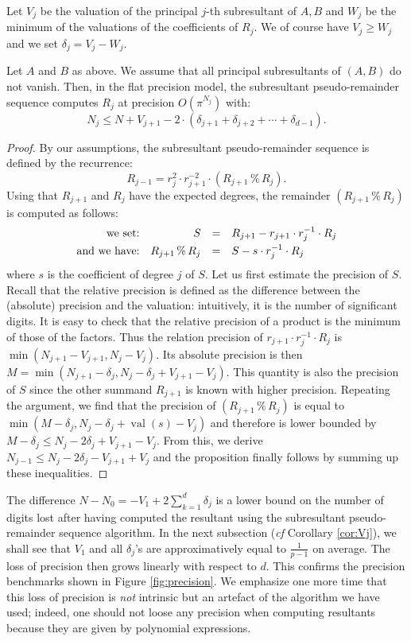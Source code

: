 \documentclass{article}
\DeclareMathOperator{\val}{val}
\begin{document}
Let $V_j$ be the valuation of the principal $j$-th subresultant of $A,B$ 
and $W_j$ be the minimum of the valuations of the coefficients of $R_j$. 
We of course have $V_j \geq W_j$ and we set $\delta_j = V_j - W_j$.

\begin{prop}
\label{prop:precEuclide}
Let $A$ and $B$ as above. We assume that all principal subresultants of 
$(A,B)$ do not vanish. Then, in the flat precision model, the 
subresultant pseudo-remainder sequence computes $R_j$ at precision 
$O(\pi^{N_j})$ with:
$$N_j \leq N + V_{j+1} - 2 \cdot (\delta_{j+1} + \delta_{j+2} + \cdots
+ \delta_{d-1}).$$
\end{prop}

\begin{proof}
By our assumptions, the subresultant pseudo-remainder sequence 
is defined by the recurrence:
$$R_{j-1} = r_j^2 \cdot r_{j+1}^{-2} \cdot 
(R_{j+1} \,\%\, R_j).$$
Using that $R_{j+1}$ and $R_j$ have the expected degrees, the
remainder $(R_{j+1} \,\%\, R_j)$ is computed as follows:
$$\begin{array}{rrcl}
\text{we set:} & S & = & R_{j+1} - r_{j+1} \cdot r_j^{-1} \cdot R_j \smallskip \\
\text{and we have:} & R_{j+1} \,\%\, R_j & = & S - s \cdot r_j^{-1} \cdot R_j
\end{array}$$
where $s$ is the coefficient of degree $j$ of $S$. Let us first estimate 
the precision of $S$. Recall that the relative precision is defined 
as the difference between the (absolute) precision and the valuation: 
intuitively, it is the number of significant digits. It is easy to check 
that the relative precision of a product is the minimum of those of the 
factors. 
Thus the relation precision of $r_{j+1} \cdot r_j^{-1} \cdot R_j$ is
$\min(N_{j+1} - V_{j+1}, N_j - V_j)$. Its absolute precision is then
$M = \min(N_{j+1} - \delta_j, N_j - \delta_j + V_{j+1} - V_j)$. This
quantity is also the precision of $S$ since the other summand
$R_{j+1}$ is known with higher precision. Repeating the argument, we
find that the precision of $(R_{j+1} \,\%\, R_j)$ is equal to 
$\min(M - \delta_j, N_j - \delta_j + \val(s) - V_j)$ and therefore is 
lower bounded by $M - \delta_j \leq N_j - 2 \delta_j + V_{j+1} - V_j$.
From this, we derive $N_{j-1} \leq N_j - 2 \delta_j - V_{j+1} + V_j$ and
the proposition finally follows by summing up these inequalities.
\end{proof}

The difference 
$N - N_0 = - V_1 + 2 \sum_{k=1}^d \delta_j$
is a lower bound on the number of digits lost after having computed the 
resultant using the subresultant pseudo-remainder sequence algorithm. In 
the next subsection (\emph{cf} Corollary \ref{cor:Vj}), we shall see that 
$V_1$ and all $\delta_j$'s are 
approximatively equal to $\frac 1 {p-1}$ on average. The loss of 
precision then grows linearly with respect to $d$. This confirms the 
precision benchmarks shown in Figure \ref{fig:precision}.
We emphasize one more time that this loss of precision is \emph{not}
intrinsic but an artefact of the algorithm we have used; indeed, one
should not loose any precision when computing resultants because they
are given by polynomial expressions.
\end{document}
